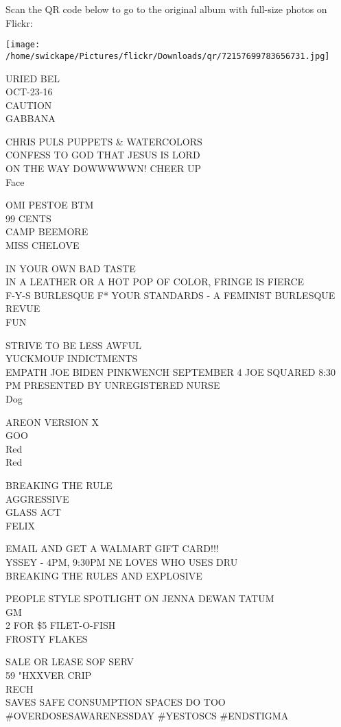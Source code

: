 \documentclass[10pt,letterpaper]{article}
\begin{document}
Scan the QR code below to go to the original album with full-size photos on Flickr:

\texttt{[image: /home/swickape/Pictures/flickr/Downloads/qr/72157699783656731.jpg]}
\pagebreak

URIED BEL\\
OCT{-}23{-}16\\
CAUTION\\
GABBANA

CHRIS PULS PUPPETS \& WATERCOLORS\\
CONFESS TO GOD THAT JESUS IS LORD\\
ON THE WAY DOWWWWWN!  CHEER UP\\
Face

OMI PESTOE BTM\\
99 CENTS\\
CAMP BEEMORE\\
MISS CHELOVE

IN YOUR OWN BAD TASTE\\
IN A LEATHER OR A HOT POP OF COLOR, FRINGE IS FIERCE\\
F{-}Y{-}S BURLESQUE F* YOUR STANDARDS {-} A FEMINIST BURLESQUE REVUE\\
FUN

STRIVE TO BE LESS AWFUL\\
YUCKMOUF INDICTMENTS\\
EMPATH JOE BIDEN PINKWENCH SEPTEMBER 4 JOE SQUARED 8:30 PM PRESENTED BY UNREGISTERED NURSE\\
Dog

AREON VERSION X\\
GOO\\
Red\\
Red

BREAKING THE RULE\\
AGGRESSIVE\\
GLASS ACT\\
FELIX

EMAIL AND GET A WALMART GIFT CARD!!!\\
YSSEY {-} 4PM, 9:30PM NE LOVES WHO USES DRU\\
BREAKING THE RULES AND EXPLOSIVE

PEOPLE STYLE SPOTLIGHT ON JENNA DEWAN TATUM\\
GM\\
2 FOR \$5 FILET{-}O{-}FISH\\
FROSTY FLAKES

SALE OR LEASE SOF SERV\\
59 "HXXVER CRIP\\
RECH\\
SAVES SAFE CONSUMPTION SPACES DO TOO \#OVERDOSESAWARENESSDAY \#YESTOSCS \#ENDSTIGMA
\end{document}
